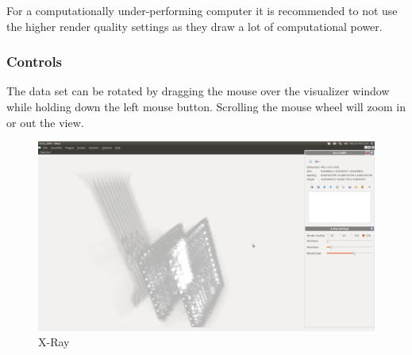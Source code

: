 For a computationally under-performing computer it is recommended to not use the
higher render quality settings as they draw a lot of computational power.

\subsubsection{Controls}
The data set can be rotated by dragging the mouse over the visualizer window while
holding down the left mouse button.
Scrolling the mouse wheel will zoom in or out the view.

\begin{figure}[h!]
	\caption{X-Ray}
	\centering
	\includegraphics[width=1.0\textwidth]{img/x-ray.png}
\end{figure}